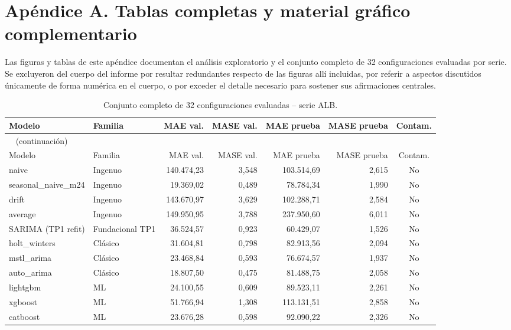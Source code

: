 \appendix

\section{Apéndice A. Tablas completas y material gráfico complementario}

Las figuras y tablas de este apéndice documentan el análisis exploratorio y el conjunto completo de 32
configuraciones evaluadas por serie. Se excluyeron del cuerpo del informe por resultar redundantes
respecto de las figuras allí incluidas, por referir a aspectos discutidos únicamente de forma numérica en
el cuerpo, o por exceder el detalle necesario para sostener sus afirmaciones centrales.

\begingroup
\tiny
\begin{longtable}{llrrrrc}
  \caption{Conjunto completo de 32 configuraciones evaluadas -- serie ALB.}
  \label{tab:completo_alb}\\
  \toprule
  Modelo & Familia & MAE val. & MASE val. & MAE prueba & MASE prueba & Contam. \\
  \midrule
  \endfirsthead
  \multicolumn{7}{l}{\small \tablename\ \thetable{} (continuación)}\\
  \toprule
  Modelo & Familia & MAE val. & MASE val. & MAE prueba & MASE prueba & Contam. \\
  \midrule
  \endhead
  \bottomrule
  \endfoot
    naive & Ingenuo & 140.474,23 & 3,548 & 103.514,69 & 2,615 & No \\
    seasonal\_naive\_m24 & Ingenuo & 19.369,02 & 0,489 & 78.784,34 & 1,990 & No \\
    drift & Ingenuo & 143.670,97 & 3,629 & 102.288,71 & 2,584 & No \\
    average & Ingenuo & 149.950,95 & 3,788 & 237.950,60 & 6,011 & No \\
    SARIMA (TP1 refit) & Fundacional TP1 & 36.524,57 & 0,923 & 60.429,07 & 1,526 & No \\
    holt\_winters & Clásico & 31.604,81 & 0,798 & 82.913,56 & 2,094 & No \\
    mstl\_arima & Clásico & 23.468,84 & 0,593 & 76.674,57 & 1,937 & No \\
    auto\_arima & Clásico & 18.807,50 & 0,475 & 81.488,75 & 2,058 & No \\
    lightgbm & ML & 24.100,55 & 0,609 & 89.523,11 & 2,261 & No \\
    xgboost & ML & 51.766,94 & 1,308 & 113.131,51 & 2,858 & No \\
    catboost & ML & 23.676,28 & 0,598 & 92.090,22 & 2,326 & No \\

\end{longtable}
